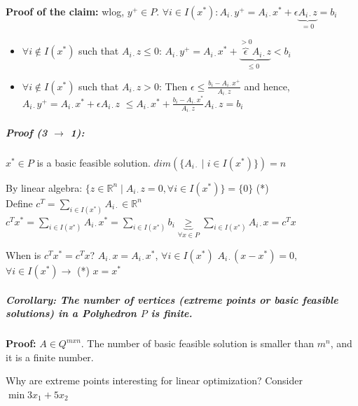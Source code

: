 \documentclass[main]{subfiles}
\begin{document}
\textbf{Proof of the claim:} wlog, $y^{+} \in P$. $\forall i \in I(x^{*}): A_{i\cdot} y^{+} = A_{i\cdot}x^{*} + \epsilon \underbrace{A_{i\cdot} z}_\text{$=0$} = b_{i}$

\begin{itemize}
\item $\forall i \notin I(x^{*})$ such that $ A_{i\cdot}z \leq 0$:
$A_{i\cdot} y^{+} = A_{i\cdot}x^{*} + \underbrace{\overbrace{\epsilon}^{\text{$>0$}} A_{i\cdot} z}_{\text{$\leq 0$ }} < b_{i}$
\item $\forall i \notin I(x^{*})$ such that $ A_{i\cdot}z > 0$:
Then $\epsilon \leq \frac{b_{i} - A_{i\cdot}x^{+}}{A_{i\cdot}z}$ and hence, $A_{i\cdot}y^{+} = A_{i\cdot}x^{*} + \epsilon A_{i\cdot}z$
$\leq A_{i\cdot}x^{*} + \frac{b_{i} - A_{i\cdot} x^{*}}{A_{i\cdot}z} A_{i\cdot} z = b_{i}$
\end{itemize}


\subparagraph{Proof (3 $\rightarrow$ 1):} $x^{*} \in P$ is a basic feasible solution. $dim(\{A_{i\cdot} \mid i \in I(x^{*})\}) = n$

By linear algebra: $\{z \in \mathbb{R}^{n} \mid A_{i\cdot}z = 0, \forall i \in I(x^{*})\} = \{0\}$ (*) \\
Define $c^{T} = \sum_{i \in I(x^{*})}^{} A_{i\cdot} \in \mathbb{R}^{n}$ \\

$c^{T}x^{*} =  \sum_{i \in I(x^{*})}^{} A_{i\cdot}x^{*} = \sum_{i \in I(x^{*})}^{} b_{i} \underbrace{\geq}_{\forall x \in P} \sum_{i \in I(x^{*})}^{} A_{i\cdot}x = c^{T}x$ 

When is $c^{T}x^{*} = c^{T}x$? $A_{i\cdot}x = A_{i\cdot}x^{*}$, $\forall i \in I(x^{*})$
$A_{i\cdot}(x - x^{*}) = 0$, $\forall i \in I(x^{*}) \rightarrow$ (*) $x = x^{*}$

\subparagraph{Corollary: The number of vertices (extreme points or basic feasible solutions) in a Polyhedron $P$ is finite.}
\textbf{Proof:} $A \in Q^{mxn}$. The number of basic feasible solution is smaller than $m^{n}$, and it is a finite number. \\

\newpage

Why are extreme points interesting for linear optimization? Consider $\min 3x_{1} + 5x_{2}$
\end{document}
